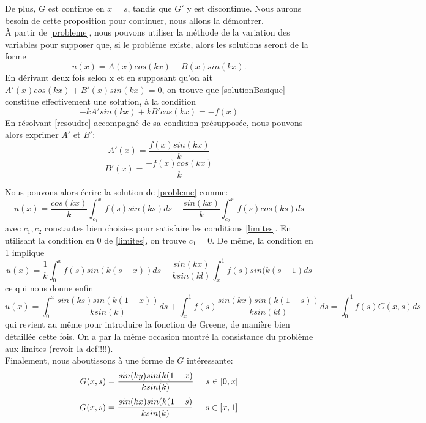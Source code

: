 \documentclass[12pt]{article}
\newcommand{\espace}{\hspace{5mm}}
\begin{document}
De plus,  $G$ est continue en $x=s$, tandis que $G'$ y est discontinue. Nous aurons besoin de cette proposition pour continuer, nous allons la démontrer. \\
À partir de \eqref{probleme}, nous pouvons utiliser la méthode de la variation des variables pour supposer que, si le problème existe, alors les solutions seront de la forme 
\begin{equation} \label{solutionBasique}
u(x) = A(x) cos(kx) + B(x) sin(kx).
\end{equation}
En dérivant deux fois selon x et en supposant qu'on ait $A'(x) cos (kx) + B'(x) sin(kx) = 0$, on trouve que \eqref{solutionBasique} constitue effectivement une solution, à la condition
\begin{equation} \label{resoudre}
-kA' sin(kx) + kB' cos(kx) = -f(x)
\end{equation}
En résolvant \eqref{resoudre} accompagné de sa condition présupposée, nous pouvons alors exprimer $A'$ et $B'$:
\begin{equation}
A'(x) = \frac{f(x) sin(kx)}{k}
\end{equation}
\begin{equation}
B'(x) = \frac{-f(x) cos(kx)}{k}
\end{equation}

Nous pouvons alors écrire la solution de \eqref{probleme} comme:
\begin{equation}
u(x) = \frac{cos(kx)}{k} \int_{c_1}^x f(s) sin (ks) ds - \frac{sin(kx)}{k} \int_{c_2}^x f(s) cos (ks) ds
\end{equation}
avec $c_1, c_2$ constantes bien choisies pour satisfaire les conditions \eqref{limites}. En utilisant la condition en 0 de \eqref{limites}, on trouve $c_1 = 0$. De même, la condition en 1 implique
\begin{equation}
u(x) = \frac{1}{k} \int_0^x f(s) sin (k(s-x)) ds - \frac{sin(kx)}{k sin(kl)} \int_x^1 f(s) sin(k(s-1) ds
\end{equation}
ce qui nous donne enfin
\begin{dmath}
u(x) =  \int_0^x\frac{sin(ks) sin(k(1-x))}{k sin(k)}ds + \int_x^1 f(s) \frac{sin(kx) sin(k(1-s))}{k sin(kl)} ds = \int_0^1 f(s) G(x,s) ds
\end{dmath}
qui revient au même pour introduire la fonction de Greene, de manière bien détaillée cette fois. On a par la même occasion montré la consistance du problème aux limites (revoir la def!!!!). \\
Finalement, nous aboutissons à une forme de $G$ intéressante:
\begin{equation}
G(x, s) = \frac{sin(ky) sin(k(1-x)}{k sin(k)} \espace s\in [0, x] 
\end{equation}
\begin{equation}
G(x, s) = \frac{sin(kx) sin(k(1-s)}{k sin(k)} \espace s\in [x,1]
\end{equation}
\end{document}

